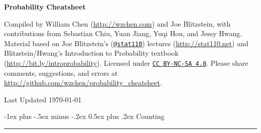 \documentclass[10pt,landscape]{article}
\makeatletter
\renewcommand{\section}{\@startsection{section}{1}{0mm}%
                                {-1ex plus -.5ex minus -.2ex}%
                                {0.5ex plus .2ex}%
                                {\normalfont\large\bfseries}}
\makeatother
\begin{document}
\raggedright
\footnotesize
\begin{multicols*}{3}
			
	\setlength{\premulticols}{1pt}
	\setlength{\postmulticols}{1pt}
	\setlength{\multicolsep}{1pt}
	\setlength{\columnsep}{2pt}
			
			
	\begin{center}
		{\Large{\textbf{Probability Cheatsheet}}} \\
		
	\end{center}
			
			
	\scriptsize
			
	Compiled by William Chen (\url{http://wzchen.com}) and Joe Blitzstein, with contributions from Sebastian Chiu, Yuan Jiang, Yuqi Hou, and Jessy Hwang. Material based on Joe Blitzstein's (\texttt{\href{http://twitter.com/stat110}{@stat110}}) lectures (\url{http://stat110.net}) and Blitzstein/Hwang's Introduction to Probability textbook (\url{http://bit.ly/introprobability}). Licensed under \texttt{\href{http://creativecommons.org/licenses/by-nc-sa/4.0/}{CC BY-NC-SA 4.0}}. Please share comments, suggestions, and errors at \url{http://github.com/wzchen/probability_cheatsheet}.
			
	\begin{center}
		Last Updated \today
	\end{center}
			
			
			
			
	\section{Counting}\smallskip \hrule height 2pt \smallskip
			

\end{multicols*}
\end{document}
